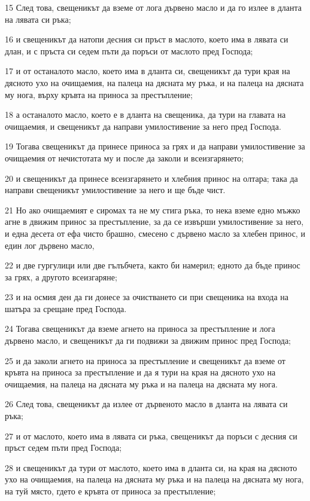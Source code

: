 \par 15 След това, свещеникът да вземе от лога дървено масло и да го излее в дланта на лявата си ръка;
\par 16 и свещеникът да натопи десния си пръст в маслото, което има в лявата си длан, и с пръста си седем пъти да поръси от маслото пред Господа;
\par 17 и от останалото масло, което има в дланта си, свещеникът да тури края на дясното ухо на очищаемия, на палеца на дясната му ръка, и на палеца на дясната му нога, върху кръвта на приноса за престъпление;
\par 18 а останалото масло, което е в дланта на свещеника, да тури на главата на очищаемия, и свещеникът да направи умилостивение за него пред Господа.
\par 19 Тогава свещеникът да принесе приноса за грях и да направи умилостивение за очищаемия от нечистотата му и после да заколи и всеизгарянето;
\par 20 и свещеникът да принесе всеизгарянето и хлебния принос на олтара; така да направи свещеникът умилостивение за него и ще бъде чист.
\par 21 Но ако очищаемият е сиромах та не му стига ръка, то нека вземе едно мъжко агне в движим принос за престъпление, за да се извърши умилостивение за него, и една десета от ефа чисто брашно, смесено с дървено масло за хлебен принос, и един лог дървено масло,
\par 22 и две гургулици или две гълъбчета, както би намерил; едното да бъде принос за грях, а другото всеизгаряне;
\par 23 и на осмия ден да ги донесе за очистването си при свещеника на входа на шатъра за срещане пред Господа.
\par 24 Тогава свещеникът да вземе агнето на приноса за престъпление и лога дървено масло, и свещеникът да ги подвижи за движим принос пред Господа;
\par 25 и да заколи агнето на приноса за престъпление и свещеникът да вземе от кръвта на приноса за престъпление и да я тури на края на дясното ухо на очищаемия, на палеца на дясната му ръка и на палеца на дясната му нога.
\par 26 След това, свещеникът да излее от дървеното масло в дланта на лявата си ръка;
\par 27 и от маслото, което има в лявата си ръка, свещеникът да поръси с десния си пръст седем пъти пред Господа;
\par 28 и свещеникът да тури от маслото, което има в дланта си, на края на дясното ухо на очищаемия, на палеца на дясната му ръка и на палеца на дясната му нога, на туй място, гдето е кръвта от приноса за престъпление;
